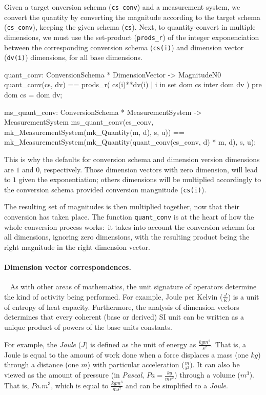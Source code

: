 \documentclass[runningheads,a4paper]{llncs}
\begin{document}
Given a target onversion schema (\texttt{cs\_conv}) and a measurement system, we convert the quantity by converting the magnitude according to the target schema (\texttt{cs\_conv}), keeping the given schema (\texttt{cs}). Next, to quantity-convert in multiple dimensions, we must use the set-product (\texttt{prods\_r}) of the integer exponenciation between the corresponding conversion schema (\texttt{cs(i)}) and dimension vector (\texttt{dv(i)}) dimensions, for all base dimensions. 
%
\begin{vdmsl}[frame=none,basicstyle=\ttfamily\scriptsize]
    quant_conv: ConversionSchema * DimensionVector -> MagnitudeN0
    quant_conv(cs, dv) ==
        prods_r({ cs(i)**dv(i) | i in set dom cs inter dom dv })
    pre
        dom cs = dom dv;

    ms_quant_conv: ConversionSchema * MeasurementSystem -> MeasurementSystem
    ms_quant_conv(cs_conv, mk_MeasurementSystem(mk_Quantity(m, d), s, u)) ==
        mk_MeasurementSystem(mk_Quantity(quant_conv(cs_conv, d) * m, d), s, u);
\end{vdmsl}
%
\noindent This is why the defaults for conversion schema and dimension version dimensions are \(1\) and \(0\), respectively. Those dimension vectors with zero dimension, will lead to \(1\) given the exponentiation; others dimensions will be multiplied accordingly to the conversion schema provided conversion mangnitude (\texttt{cs(i)}).

The resulting set of magnitudes is then multiplied together, now that their conversion has taken place. The function \texttt{quant\_conv} is at the heart of how the whole conversion process works:~it takes into account the conversion schema for all dimensions, ignoring zero dimensions, with the resulting product being the right magnitude in the right dimension vector.   

\paragraph*{Dimension vector correspondences.}~
%
As with other areas of mathematics, the unit signature of operators determine the kind of activity being performed. For example, Joule per Kelvin (\(\frac{J}{K}\)) is a unit of entropy of heat capacity. Furthermore, the analysis of dimension vectors determines that every coherent (base or derived) SI unit can be written as a unique product of powers of the base units constants. 

For example, the \textit{Joule} (\(J\)) is defined as the unit of energy as \(\frac{kgm^2}{s^2}\). That is, a Joule is equal to the amount of work done when a force displaces a mass (one \(kg\)) through a distance (one \(m\)) with particular acceleration (\(\frac{m}{s^2}\)). It can also be viewed as the amount of pressure (in \textit{Pascal}, \(Pa = \frac{kg}{ms^2}\)) through a volume (\(m^3\)). That is, \(Pa . m^3\), which is equal to \(\frac{kgm^3}{ms^2}\) and can be simplified to a \textit{Joule}. 
\end{document}
